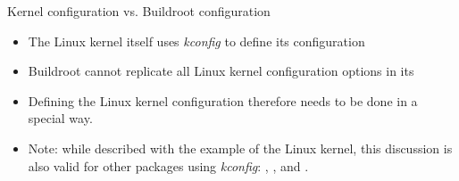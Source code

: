 \begin{frame}{Kernel configuration vs. Buildroot configuration}
  \begin{itemize}
  \item The Linux kernel itself uses {\em kconfig} to define its
    configuration
  \item Buildroot cannot replicate all Linux kernel configuration
    options in its 
  \item Defining the Linux kernel configuration therefore needs to be
    done in a special way.
  \item Note: while described with the example of the Linux kernel,
    this discussion is also valid for other packages using {\em
      kconfig}: , ,  and
    .
  \end{itemize}
\end{frame}

